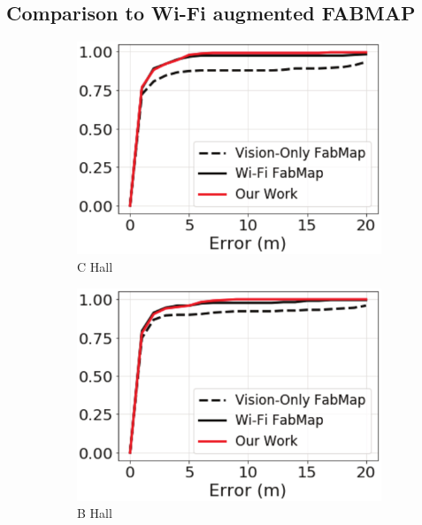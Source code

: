 \subsection{Comparison to Wi-Fi augmented FABMAP}
\begin{figure}
	\begin{subfigure}[b]{.24\textwidth}
		\includegraphics[width=\textwidth]{Figure10_a.eps}
		\caption{C Hall}
	\end{subfigure}
	\begin{subfigure}[b]{0.24\textwidth}
		\includegraphics[width=\textwidth]{Figure10_b.eps}
		\caption{B Hall}
	\end{subfigure}
	\begin{subfigure}[b]{0.24\textwidth}

\end{subfigure}
\end{figure}
